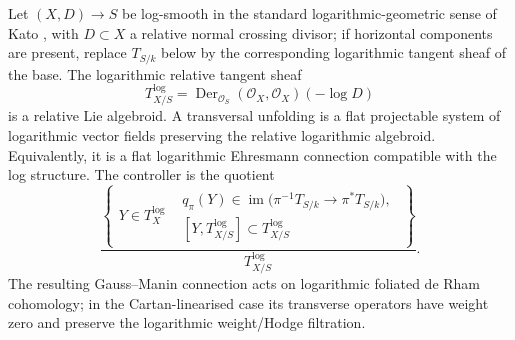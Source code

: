 \documentclass[11pt,reqno,a4paper,dvipsnames,x11names]{amsart}
\numberwithin{equation}{section}
\theoremstyle{plain}
\theoremstyle{definition}
\theoremstyle{remark}
\newcommand{\cO}{\mathcal{O}}
\newcommand{\kk}{k}
\begin{document}
Let \((X,D)\to S\) be log-smooth in the standard logarithmic-geometric sense of Kato \cite{Kato89}, with \(D\subset X\) a relative normal crossing divisor; if horizontal components are present, replace \(T_{S/\kk}\) below by the corresponding logarithmic tangent sheaf of the base. The logarithmic relative tangent sheaf
\[
 T_{X/S}^{\log}=\operatorname{Der}_{\cO_S}(\cO_X,\cO_X)(-\log D)
\]
is a relative Lie algebroid. A transversal unfolding is a flat projectable system of logarithmic vector fields preserving the relative logarithmic algebroid. Equivalently, it is a flat logarithmic Ehresmann connection compatible with the log structure. The controller is the quotient
\[
\frac{
\left\{
\begin{array}{c|l}
Y\in T_X^{\log} &
\begin{array}{l}
q_\pi(Y)\in \operatorname{im}\bigl(\pi^{-1}T_{S/\kk}\to\pi^*T_{S/\kk}\bigr),\\[2pt]
[Y,T_{X/S}^{\log}]\subset T_{X/S}^{\log}
\end{array}
\end{array}
\right\}}
{T_{X/S}^{\log}}.
\]
The resulting Gauss--Manin connection acts on logarithmic foliated de Rham cohomology; in the Cartan-linearised case its transverse operators have weight zero and preserve the logarithmic weight/Hodge filtration.
\end{document}

